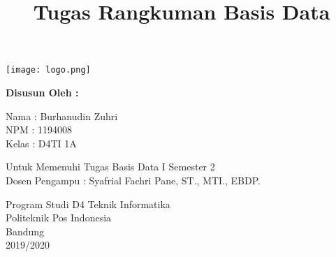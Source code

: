 \documentclass[a4paper,12 pt]{article}
\title{\textbf{Tugas Rangkuman Basis Data}\linebreak}
\date{}
\begin{document}
	\maketitle
	\begin{center}
		\texttt{[image: logo.png]}
	\end{center}
	\begin{center}
		\textbf{Disusun Oleh :} \linebreak
	\end{center}
	\vspace{0.5 cm}
	\begin{center}
		\begin{center}
			Nama   :   Burhanudin Zuhri\\
			NPM   :  1194008\\
			Kelas   :  D4TI 1A\\ 
		\end{center}

		Untuk Memenuhi Tugas Basis Data I Semester 2 \\
		Dosen Pengampu : Syafrial Fachri Pane, ST., MTI., EBDP. 				\linebreak

		Program Studi D4 Teknik Informatika \\
		Politeknik Pos Indonesia\\
		Bandung\\
		2019/2020\linebreak
	\end{center}
	\newpage
\end{document}
